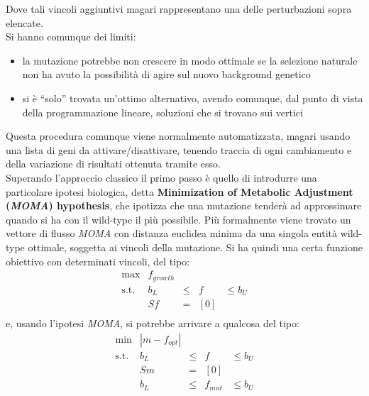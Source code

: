 \documentclass[a4paper,12pt, oneside]{book}
\begin{document}
Dove tali vincoli aggiuntivi magari rappresentano una delle perturbazioni sopra
elencate. \\
Si hanno comunque dei limiti:
\begin{itemize}
  \item la mutazione potrebbe non crescere in modo ottimale se la selezione
  naturale non ha avuto la possibilità di agire sul nuovo background genetico 
  \item si è ``solo'' trovata un'ottimo alternativo, avendo comunque, dal punto
  di vista della programmazione lineare, soluzioni che si trovano sui vertici
\end{itemize}
Questa procedura comunque viene normalmente automatizzata, magari usando una
lista di geni da attivare/disattivare, tenendo traccia di ogni cambiamento e
della variazione di risultati ottenuta tramite esso.\\
Superando l'approccio classico il primo passo è quello di introdurre una
particolare ipotesi biologica, detta \textbf{Minimization of Metabolic
  Adjustment (\textit{MOMA}) hypothesis}, che ipotizza che una mutazione
tenderà ad approssimare quando si ha con il wild-type il più possibile. Più
formalmente viene trovato un vettore di flusso \textit{MOMA} con distanza
euclidea minima da una singola entità wild-type ottimale, soggetta ai vincoli
della mutazione. Si ha quindi una certa funzione obiettivo con determinati vincoli, del tipo:
\begin{equation*}
  \begin{array}{rrclcl}
    \displaystyle \max & f_{growth} \\
    \textrm{s.t.} & b_L & \leq & f & \leq b_{U} \\
                       & Sf & = & [0] \\
  \end{array}
\end{equation*}
e, usando l'ipotesi \textit{MOMA}, si potrebbe arrivare a qualcosa del tipo:
\begin{equation*}
  \begin{array}{rrclcl}
    \displaystyle \min & |m-f_{opt}| \\
    \textrm{s.t.} & b_L & \leq & f & \leq b_{U} \\
                       & Sm & = & [0] \\
                       & b_L & \leq & f_{mut} & \leq b_{U} \\
  \end{array}
\end{equation*}
\end{document}
